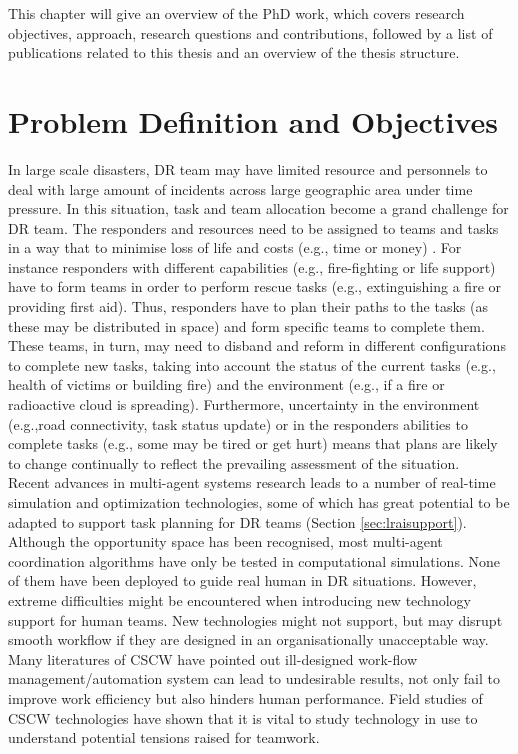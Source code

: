 This chapter will give an overview of the PhD work, which covers research objectives, approach, research questions and contributions, followed by a list of publications related to this thesis and an overview of the thesis structure.\\


\section{Problem Definition and Objectives}
In large scale disasters, \ac{DR} team may have limited resource and personnels to deal with large amount of incidents across large geographic area under time pressure. In this situation, task and team allocation become a grand challenge for \ac{DR} team. The responders and resources need to be assigned to teams and tasks in a way that to minimise loss of life and costs (e.g., time or money) . For instance responders with different capabilities (e.g., fire-fighting or life support) have to form teams in order to perform rescue tasks (e.g., extinguishing a fire or providing first aid). Thus, responders have to plan their paths to the tasks (as these may be distributed in space) and form specific teams to complete them. These teams, in turn, may need to disband and reform in different configurations to complete new tasks, taking into account the status of the current tasks (e.g., health of victims or building fire) and the environment (e.g., if a fire or radioactive cloud is spreading). Furthermore, uncertainty in the environment (e.g.,road connectivity, task status update) or in the responders abilities to complete tasks (e.g., some may be tired or get hurt) means that plans are likely to change continually to reflect the prevailing assessment of the situation.\\

Recent advances in multi-agent systems research leads to a number of real-time simulation and optimization technologies, some of which has great potential to be adapted to support task planning for \ac{DR} teams (Section \ref{sec:lraisupport}). Although the opportunity space has been recognised, most multi-agent coordination algorithms have only be tested in computational simulations. None of them have been deployed to guide real human in DR situations. However, extreme difficulties might be encountered when introducing new technology support for human teams. New technologies might not support, but may disrupt smooth workflow if they are designed in an organisationally unacceptable way. Many  literatures of \ac{CSCW} have pointed out ill-designed work-flow management/automation system can lead to undesirable results, not only fail to improve work efficiency but also hinders human performance. Field studies of \ac{CSCW} technologies have shown that it is vital to study technology in use to understand potential tensions raised for teamwork. \\

